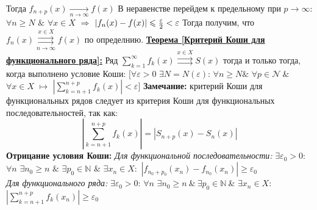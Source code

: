 \documentclass[a4paper,12pt]{article} %
\renewcommand {\geq}{\geqslant}
\renewcommand {\leq}{\leqslant}
\begin{document}
Тогда $f_{n+p}(x) \underset{n \longrightarrow \infty}{\longrightarrow} f(x)$ \newline \newline 
В неравенстве перейдем к предельному при $p \longrightarrow \infty$:\\
$\forall n \geq N$ $\&$ $\forall x \in X$ $\Rightarrow$ $|f_n(x) - f(x)| \leq {\varepsilon \over 2} < \varepsilon$ 
\newline \newline 
Тогда получим, что $f_n(x) \overset{x \in X}{\underset{n \rightarrow \infty}{\rightrightarrows}} f(x)$ по определнию.
\newline \newline 
\noindent \underline{\textbf{Теорема [Критерий Коши для функционального ряда]:}}
Ряд $\sum\limits_{k = 1}^{\infty}  f_k(x) \overset{x \in X}{\rightrightarrows} S(x)$ тогда и только тогда, когда выполнено условие Коши: 
\newline 
\hspace*{5mm}$\big[\forall \varepsilon > 0 $  $\exists N = N(\varepsilon)$: $\forall n \geq N \& $   $\forall p \in  \mathscr{N}~ \&$ $\forall x \in X$ $\longmapsto$ $\left|\sum\limits_{k = n+1}^{n+p}f_k(x)\right| < \varepsilon\big]$
\textbf{Замечание:} критерий Коши для функциональных рядов следует из критерия Коши для функциональных последовательностей, так как: \newline 
$$\left|\sum\limits_{k = n+1}^{n+p} f_k(x)\right| = \left| S_{n+p}(x) - S_n(x)\right|$$
\textbf{Отрицание условия Коши:} 
\newline 
\textit{Для функциональной последовательности:}
\newline
$\exists \varepsilon_0 > 0$: $\forall n$ $\exists n_0 \geq n$ $\& $ $\exists  p_0 \in \mathds{N}$ $\&$ $\exists x_n \in X:$ $|f_{n_0+p_0}(x_n) - f_{n_0}(x_n)| \geq \varepsilon_0$ 
\\[5mm] 
\textit{Для функционального ряда:}
\newline
$\exists \varepsilon_0 > 0$: $\forall n$ $\exists n_0 \geq n ~\&  ~\exists  p_0 \in \mathds{N} ~\& $ $\exists x_n \in X:$ $\left|\sum\limits_{k = n+1}^{n+p}f_k(x_n)\right| \geq \varepsilon_0$ 
\end{document}
